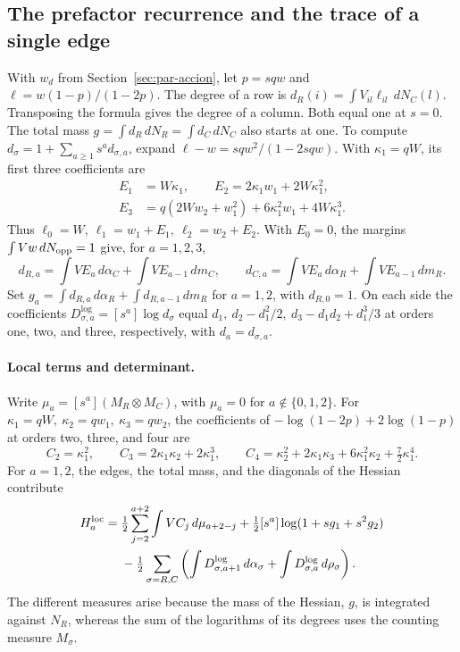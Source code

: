 \subsection{The prefactor recurrence and the trace of a single edge}\label{sec:par-prefactor}

With \(w_d\) from Section~\ref{sec:par-accion}, let \(p=sqw\) and \(\ell=w(1-p)/(1-2p)\). The degree of a
row is \(d_R(i)=\int V_{il}\ell_{il}\,dN_C(l)\). Transposing the formula gives the degree of a column.
Both equal one at \(s=0\). The total mass \(g=\int d_R\,dN_R=\int d_C\,dN_C\) also starts at one. To
compute \(d_\sigma=1+\sum_{a\ge1}s^a d_{\sigma,a}\), expand \(\ell-w=sqw^2/(1-2sqw)\). With
\(\kappa_1=qW\), its first three coefficients are \begin{align*}
 E_1&=W\kappa_1,\qquad E_2=2\kappa_1 w_1+2W\kappa_1^2,\\
 E_3&=q(2Ww_2+w_1^2)+6\kappa_1^2w_1+4W\kappa_1^3 .
\end{align*} Thus \(\ell_0=W,\ \ell_1=w_1+E_1,\ \ell_2=w_2+E_2\). With \(E_0=0\), the margins \(\int
Vw\,dN_{\rm opp}=1\) give, for \(a=1,2,3\), \[
 d_{R,a}=\int VE_a\,d\alpha_C+\int VE_{a-1}\,dm_C,\qquad
 d_{C,a}=\int VE_a\,d\alpha_R+\int VE_{a-1}\,dm_R .
\] Set \(g_a=\int d_{R,a}\,d\alpha_R+\int d_{R,a-1}\,dm_R\) for \(a=1,2\), with \(d_{R,0}=1\). On each
side the coefficients \(D_{\sigma,a}^{\log}=[s^a]\log d_\sigma\) equal \(d_1,\ d_2-d_1^2/2,\
d_3-d_1d_2+d_1^3/3\) at orders one, two, and three, respectively, with \(d_a=d_{\sigma,a}\).

\paragraph{Local terms and determinant.} Write \(\mu_a=[s^a](M_R\otimes M_C)\), with \(\mu_a=0\) for
\(a\notin\{0,1,2\}\). For \(\kappa_1=qW,\ \kappa_2=qw_1,\ \kappa_3=qw_2\), the coefficients of
\(-\log(1-2p)+2\log(1-p)\) at orders two, three, and four are \[
 C_2=\kappa_1^2,\qquad C_3=2\kappa_1\kappa_2+2\kappa_1^3,\qquad
 C_4=\kappa_2^2+2\kappa_1\kappa_3+6\kappa_1^2\kappa_2+\tfrac72\kappa_1^4 .
\] For \(a=1,2\), the edges, the total mass, and the diagonals of the Hessian contribute \begin{align*}
 H_a^{\rm loc}={}&\tfrac12\sum_{j=2}^{a+2}\int V C_j\,d\mu_{a+2-j}
 +\tfrac12[s^a]\log(1+sg_1+s^2g_2)\\
 &-\tfrac12\sum_{\sigma=R,C}
 \left(\int D_{\sigma,a+1}^{\log}\,d\alpha_\sigma+
       \int D_{\sigma,a}^{\log}\,d\rho_\sigma\right).
\end{align*} The different measures arise because the mass of the Hessian, \(g\), is integrated against
\(N_R\), whereas the sum of the logarithms of its degrees uses the counting measure \(M_\sigma\).

